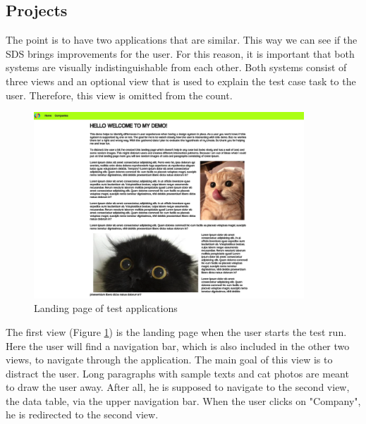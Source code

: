\subsection{Projects}
The point is to have two applications that are similar. This way we can see if the SDS brings improvements for the user. For this reason, it is important that both systems are visually indistinguishable from each other. Both systems consist of three views and an optional view that is used to explain the test case task to the user. Therefore, this view is omitted from the count. \\

\begin{figure}[hbtp]
    \centerline{\includegraphics[height=7cm, draft=false]{images/demo_view_landing_page.png}}
    \caption{Landing page of test applications}
    \label{landing_page}
    \end{figure}
The first view (Figure \ref{landing_page}) is the landing page when the user starts the test run. Here the user will find a navigation bar, which is also included in the other two views, to navigate through the application. The main goal of this view is to distract the user. Long paragraphs with sample texts and cat photos are meant to draw the user away. After all, he is supposed to navigate to the second view, the data table, via the upper navigation bar. When the user clicks on "Company", he is redirected to the second view. 
\\

